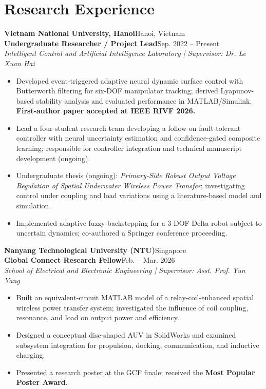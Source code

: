 \documentclass[11pt,a4paper]{article}
\newcommand{\experience}[5]{%
  \par\needspace{6\baselineskip}\noindent\hspace*{0.22cm}\textbf{#1}\hfill #2\\[-1pt]
  \hspace*{0.22cm}\textbf{#3}\hfill #4\\[-1pt]
  \hspace*{0.22cm}\textit{#5}\par\vspace{2pt}}
\newenvironment{expbullets}{\begin{itemize}[leftmargin=0.52cm,topsep=3pt,itemsep=2.3pt,parsep=0pt,partopsep=0pt,label={\textperiodcentered}]}{\end{itemize}}
\begin{document}
\section{Research Experience}
\experience{Vietnam National University, Hanoi}{Hanoi, Vietnam}{Undergraduate Researcher / Project Lead}{Sep. 2022 -- Present}{Intelligent Control and Artificial Intelligence Laboratory | Supervisor: Dr. Le Xuan Hai}
\begin{expbullets}
  \item Developed event-triggered adaptive neural dynamic surface control with Butterworth filtering for six-DOF manipulator tracking; derived Lyapunov-based stability analysis and evaluated performance in MATLAB/Simulink. \textbf{First-author paper accepted at IEEE RIVF 2026.}
  \item Lead a four-student research team developing a follow-on fault-tolerant controller with neural uncertainty estimation and confidence-gated composite learning; responsible for controller integration and technical manuscript development (ongoing).
  \item Undergraduate thesis (ongoing): \textit{Primary-Side Robust Output Voltage Regulation of Spatial Underwater Wireless Power Transfer}; investigating control under coupling and load variations using a literature-based model and simulation.
  \item Implemented adaptive fuzzy backstepping for a 3-DOF Delta robot subject to uncertain dynamics; co-authored a Springer conference proceeding.
\end{expbullets}
\vspace{3pt}
\experience{Nanyang Technological University (NTU)}{Singapore}{Global Connect Research Fellow}{Feb. -- Mar. 2026}{School of Electrical and Electronic Engineering | Supervisor: Asst. Prof. Yun Yang}
\begin{expbullets}
  \item Built an equivalent-circuit MATLAB model of a relay-coil-enhanced spatial wireless power transfer system; investigated the influence of coil coupling, resonance, and load on output power and efficiency.
  \item Designed a conceptual disc-shaped AUV in SolidWorks and examined subsystem integration for propulsion, docking, communication, and inductive charging.
  \item Presented a research poster at the GCF finale; received the \textbf{Most Popular Poster Award}.
\end{expbullets}
\vspace{3pt}
\end{document}

